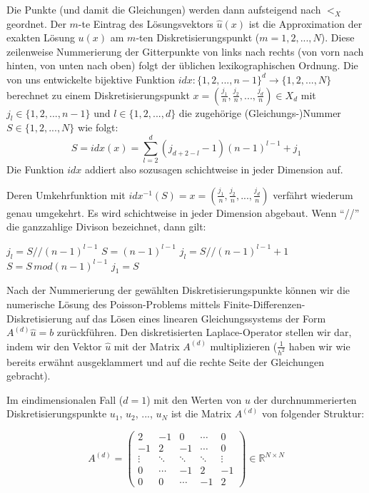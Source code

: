 \documentclass{scrartcl}
\newcommand{\R}{\mathbb{R}}
\begin{document}
Die Punkte (und damit die Gleichungen) werden dann aufsteigend nach $<_X$ geordnet. Der $m$-te Eintrag des Lösungsvektors $\hat{u}(x)$ ist die Approximation der exakten Lösung $u(x)$ am $m$-ten Diskretisierungspunkt ($m = 1, 2, ..., N$). Diese zeilenweise Nummerierung der Gitterpunkte von links nach rechts (von vorn nach hinten, von unten nach oben) folgt der üblichen lexikographischen Ordnung.\cite{vogt2006}
Die von uns entwickelte bijektive Funktion $idx: \lbrace1, 2, ..., n-1\rbrace^d \to \lbrace1, 2, ..., N\rbrace$ berechnet zu einem Diskretisierungspunkt
$x = (\frac{j_1}{n}, \frac{j_2}{n}, ..., \frac{j_d}{n}) \in X_d$ mit $j_l \in \lbrace1, 2, ..., n-1\rbrace$ und $l \in \lbrace1, 2, ..., d\rbrace$ die zugehörige (Gleichungs-)Nummer $S \in \lbrace1, 2, ..., N\rbrace$ wie folgt:
\[S=idx(x) = \sum_{l=2}^{d} (j_{d+2-l}-1)(n-1)^{l-1}+j_1 \]
Die Funktion $idx$ addiert also sozusagen schichtweise in jeder Dimension auf.

Deren Umkehrfunktion mit $idx^{-1}(S) = x = (\frac{j_1}{n}, \frac{j_2}{n}, ..., \frac{j_d}{n})$ verfährt wiederum genau umgekehrt. Es wird schichtweise in jeder Dimension abgebaut. Wenn "`//"' die ganzzahlige Divison bezeichnet, dann gilt:

\begin{shaded}
  \begin{algorithmic}
        \State $j_l=S//(n-1)^{l-1}$
        \State $S = (n-1)^{l-1}$
      \Else
        \State $j_l=S//(n-1)^{l-1} + 1$
        \State $S = S \, mod(n-1)^{l-1}$
      \EndIf
    \EndFor
    \State $j_1 = S$
  \end{algorithmic}
\end{shaded}

Nach der Nummerierung der gewählten Diskretisierungspunkte können wir die numerische Lösung des Poisson-Problems mittels Finite-Differenzen-Diskretisierung auf das Lösen eines linearen Gleichungssystems der Form $A^{(d)}\hat{u}=b$ zurückführen.
Den diskretisierten Laplace-Operator stellen wir dar, indem wir den Vektor $\hat{u}$ mit der Matrix $A^{(d)}$ multiplizieren ($\frac{1}{h^2}$ haben wir wie bereits erwähnt ausgeklammert und auf die rechte Seite der Gleichungen gebracht).

Im eindimensionalen Fall ($d=1$) mit den Werten von $u$ der durchnummerierten Diskretisierungspunkte $u_1$, $u_2$, ..., $u_N$ ist die Matrix $A^{(d)}$ von folgender Struktur\cite{vogt2006, rabus2019}:

\[A^{(d)}=
\begin{pmatrix}
   2 & -1 &  0 & \cdots & 0 \\
  -1 &  2 & -1 & \cdots & 0 \\
   \vdots & \ddots & \ddots & \ddots & \vdots \\
   0 & \cdots & -1 &  2 & -1 \\
   0 & 0 & \cdots & -1 &  2
\end{pmatrix}
\in\R^{N\times N}
\]
\end{document}
